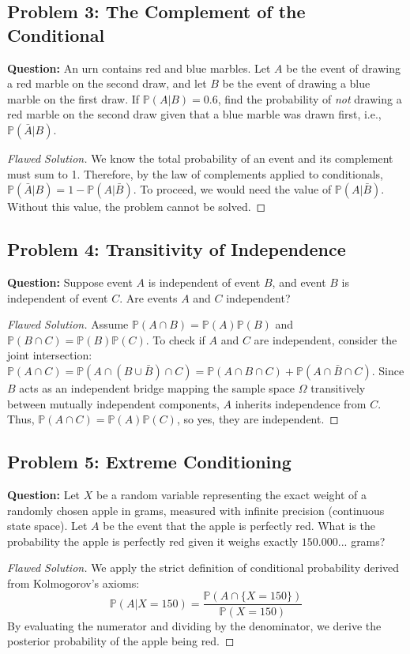 \documentclass[12pt, a4paper]{article}
\theoremstyle{definition}
\theoremstyle{remark}
\newcommand{\Prob}{\mathbb{P}}
\newcommand{\W}{\Omega}
\newcommand{\1}{\mathbf{1}}
\begin{document}
\subsection*{Problem 3: The Complement of the Conditional}
\textbf{Question:} An urn contains red and blue marbles. Let $A$ be the event of drawing a red marble on the second draw, and let $B$ be the event of drawing a blue marble on the first draw. If $\Prob(A|B) = 0.6$, find the probability of \textit{not} drawing a red marble on the second draw given that a blue marble was drawn first, i.e., $\Prob(\bar{A}|B)$.
\begin{proof}[Flawed Solution]
We know the total probability of an event and its complement must sum to 1.
Therefore, by the law of complements applied to conditionals, $\Prob(\bar{A}|B) = 1 - \Prob(A|\bar{B})$.
To proceed, we would need the value of $\Prob(A|\bar{B})$. Without this value, the problem cannot be solved.
\end{proof}

\subsection*{Problem 4: Transitivity of Independence}
\textbf{Question:} Suppose event $A$ is independent of event $B$, and event $B$ is independent of event $C$. Are events $A$ and $C$ independent?
\begin{proof}[Flawed Solution]
Assume $\Prob(A \cap B) = \Prob(A)\Prob(B)$ and $\Prob(B \cap C) = \Prob(B)\Prob(C)$.
To check if $A$ and $C$ are independent, consider the joint intersection:
$\Prob(A \cap C) = \Prob(A \cap (B \cup \bar{B}) \cap C) = \Prob(A \cap B \cap C) + \Prob(A \cap \bar{B} \cap C)$.
Since $B$ acts as an independent bridge mapping the sample space $\W$ transitively between mutually independent components, $A$ inherits independence from $C$. Thus, $\Prob(A \cap C) = \Prob(A)\Prob(C)$, so yes, they are independent.
\end{proof}

\subsection*{Problem 5: Extreme Conditioning}
\textbf{Question:} Let $X$ be a random variable representing the exact weight of a randomly chosen apple in grams, measured with infinite precision (continuous state space). Let $A$ be the event that the apple is perfectly red. What is the probability the apple is perfectly red given it weighs exactly $150.000...$ grams?
\begin{proof}[Flawed Solution]
We apply the strict definition of conditional probability derived from Kolmogorov's axioms:
\[ \Prob(A | X = 150) = \frac{\Prob(A \cap \{X=150\})}{\Prob(X=150)} \]
By evaluating the numerator and dividing by the denominator, we derive the posterior probability of the apple being red.
\end{proof}
\end{document}
